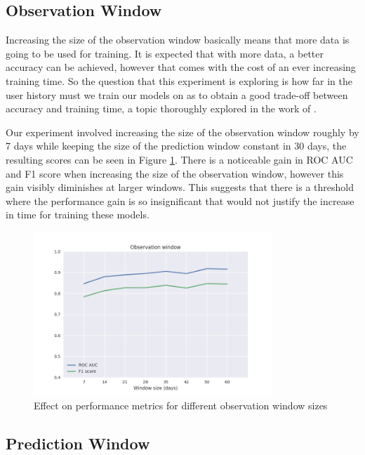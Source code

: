 \documentclass{kththesis}
\begin{document}
\subsection{Observation Window}

Increasing the size of the observation window basically means that more data is going to be used for training. It is expected that with more data, a better accuracy can be achieved, however that comes with the cost of an ever increasing training time. So the question that this experiment is exploring is how far in the user history must we train our models on as to obtain a good trade-off between accuracy and training time, a topic thoroughly explored in the work of \citep{Ballings2012}.

Our experiment involved increasing the size of the observation window roughly by 7 days while keeping the size of the prediction window constant in 30 days, the resulting scores can be seen in Figure \ref{fig:obswindow}. There is a noticeable gain in ROC AUC and F1 score when increasing the size of the observation window, however this gain visibly diminishes at larger windows. This suggests that there is a threshold where the performance gain is so insignificant that would not justify the increase in time for training these models.

	\begin{figure}[t]
	\centering
    \includegraphics[width=0.8\textwidth, natwidth=400bp, natheight=200bp]{figures/obswindow_line.png}
	\caption{Effect on performance metrics for different observation window sizes}	
	\label{fig:obswindow}
	\end{figure}

\subsection{Prediction Window}
\end{document}
